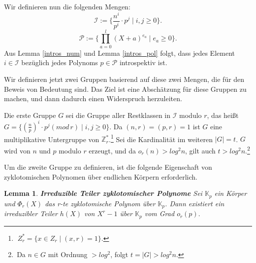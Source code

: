 \documentclass[12pt,oneside]{article}
\newtheorem{lemma}[theorem]{Lemma}
\theoremstyle{remark}
\theoremstyle{definition}
\begin{document}
Wir definieren nun die folgenden Mengen:\newline\newline
\begin{equation}\label{I_Set}
      \mathcal{I} := \{ \frac{n^i}{p^i} \cdot p^j \mid i,j \geq 0\}.
\end{equation}
\begin{equation}
     \mathcal{P} := \{ \prod_{a = 0}^{l} (X + a)^{e_{a}} \mid e_{a} \geq 0 \}.
\end{equation}\label{P_Set}
\newline\newline
Aus Lemma \ref{intros_num} und Lemma \ref{intros_pol} folgt, dass jedes Element $i \in \mathcal{I}$ bezüglich jedes Polynoms $p \in \mathcal{P}$ introspektiv ist.\newline\newline

Wir definieren jetzt zwei Gruppen basierend auf diese zwei Mengen, die für den Beweis von Bedeutung sind. Das Ziel ist eine Abschätzung für diese Gruppen zu machen, und dann dadurch einen Widerspruch herzuleiten.\newline\newline

Die erste Gruppe $G$ sei die Gruppe aller Restklassen in $\mathcal{I}$ modulo $r$, das heißt $G = \{(\frac{n}{p})^i \cdot p^j ( mod \, r) \mid i,j \geq 0 \}$. Da $(n,r) = (p,r) = 1 $ ist $G$ eine multiplikative Untergruppe von $\mathbb{Z}_{r}^{*}$.\footnote{$\; {Z}_{r}^{*} = \{ x \in Z_{r} \mid (x,r) =1 \}$.} Sei die Kardinalität im weiteren $ | G | = t $. $G$ wird von $n$ und $p$ modulo $r$ erzeugt, und da $o_{r}(n) > log^2 n$, gilt auch $t > log^2 n$.\footnote{$ \,$Da $n \in G$ mit Ordnung $> log^2 $, folgt $t = |G| > log^2n$.}\newline\newline

Um die zweite Gruppe zu definieren, ist die folgende Eigenschaft von zyklotomischen Polynomen über endlichen Körpern erforderlich.

\begin{lemma}\label{cyc_ov_fields}
\textbf{Irreduzible Teiler zyklotomischer Polynome}\newline
Sei $\mathbb{K}_{p}$ ein Körper und $\Phi_{r}(X)$ das r-te zyklotomische Polynom über $\mathbb{K}_{p}$. Dann existiert ein irreduzibler Teiler $h(X)$ von $X^r - 1$ über $\mathbb{K}_{p}$ vom Grad $o_{r}(p).$
\end{lemma}
\end{document}
